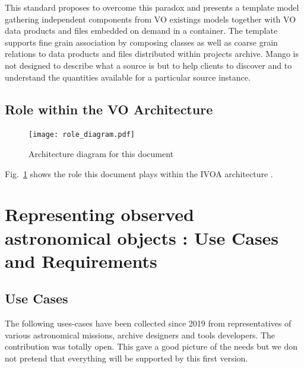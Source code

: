 \documentclass[11pt,a4paper]{ivoa}
\newcommand{\TODO}[1]{%
    \noindent%
    \colorbox{todocolor}{%
            \parbox{0.85\linewidth}{\sffamily \textbf{TODO:}\\
            #1}
    }%
    \vspace{2pt}

}
\begin{document}
This standard proposes to overcome this paradox and presents a template model gathering independent components from VO existings models 
together with VO data products and files embedded on demand in a container.
The template supports fine grain association by composing classes as well as coarse grain relations to data products and files distributed within projects archive.
Mango is not designed to describe what a source is but to help clients to discover and to understand the quantities available for a particular source instance.

\subsection{Role within the VO Architecture}

\begin{figure}
\centering


\texttt{[image: role\_diagram.pdf]}
\caption{Architecture diagram for this document}
\label{fig:archdiag}
\end{figure}

Fig.~\ref{fig:archdiag} shows the role this document plays within the
IVOA architecture \citep{note:VOARCH}.



\section{Representing observed astronomical objects : Use Cases and  Requirements}

\subsection{Use Cases}
The following uses-cases have been collected since 2019 from representatives of various astronomical missions, archive designers and tools developers.
The contribution was totally open. This gave a good picture of the needs but we don not pretend that everything will be supported by this first version.

\end{document}

